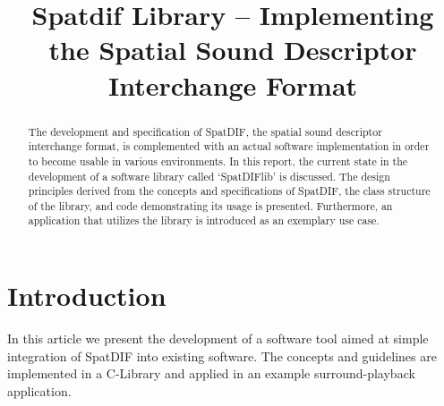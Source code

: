 \documentclass[a4paper]{article}
\title{Spatdif Library -- Implementing the Spatial Sound Descriptor Interchange Format}
\begin{document}
%

\newcommand{\red}[1]{\textcolor{red}{#1}}
\newcommand{\todo}[1]{\noindent\textcolor{red}{[\underline{TODO}: #1]}}

\makeatletter 
\def\ps@myheadings{%
\let\ps@jpl@in\ps@plain%
\def\@evenhead{\reset@font\hfil\leftmark\hfil}%
\def\@oddhead{\reset@font\hfil\rightmark\hfil}%
\let\@mkboth\@gobbletwo%
\let\sectionmark\@gobble%
\let\subsectionmark\@gobble%
% 
\def\@oddfoot{\reset@font\hfil-- \thepage --\hfil}%
\let\@evenfoot\@oddfoot 
} 
\makeatother 
\setcounter{page}{1} 
\pagestyle{myheadings} 
\maketitle
\thispagestyle{myheadings}
\sloppy
{}

\begin{abstract}

The development and specification of SpatDIF, the spatial sound descriptor interchange format, is complemented with an actual software implementation in order to become usable in various environments. 
In this report, the current state in the development of a software library called `SpatDIFlib' is discussed.
The design principles derived from the concepts and specifications of SpatDIF, the class structure of the library, and code demonstrating its usage is presented.
Furthermore, an application that utilizes the library is introduced as an exemplary use case.

\end{abstract}

\section{Introduction}

In this article we present the development of a software tool aimed at simple integration of SpatDIF into existing software.
The concepts and guidelines are implemented in a C-Library and applied in an example surround-playback application.
\end{document}
